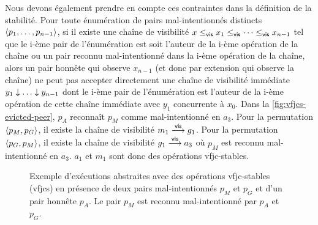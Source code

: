 Nous devons également prendre en compte ces contraintes dans la définition de la stabilité.
Pour toute énumération de pairs mal-intentionnés distincts $\tuple*{p_1, \dotsc ,p_{n-1}}$, si il existe une chaîne de visibilité $x \viseq x_1 \viseq \dotsb \viseq x_{n-1}$ tel que le i-ème pair de l'énumération est soit l'auteur de la i-ème opération de la chaîne ou un pair reconnu mal-intentionné dans la i-ème opération de la chaîne, alors un pair honnête qui observe $x_{n-1}$ (et donc par extension qui observe la chaîne) ne peut pas accepter directement une chaîne de visibilité immédiate $y_1 \idr \dotsc \idr y_{n-1}$ dont le i-ème pair de l'énumération est l'auteur de la i-ème opération de cette chaîne immédiate avec $y_1$ concurrente à $x_0$.
Dans la \autoref{fig:vfjcs-evicted-peer}, $p_A$ reconnaît $p_M$ comme mal-intentionné en $a_3$.
Pour la permutation $\tuple*{p_M, p_G}$, il existe la chaîne de visibilité $m_1 \vis g_1$.
Pour la permutation $\tuple*{p_G, p_M}$, il existe la chaîne de visibilité $g_1 \vis a_3$ où $p_M$ est reconnu mal-intentionné en $a_3$.
$a_1$ et $m_1$ sont donc des opérations vfjc-stables.

\begin{figure}[htb]
\centering
{}
\caption{Exemple d'exécutions abstraites avec des opérations vfjc-stables (vfjcs) en présence de deux pairs mal-intentionnés $p_M$ et $p_G$ et d'un pair honnête $p_A$.
Le pair $p_M$ est reconnu mal-intentionné par $p_A$ et $p_G$.}\label{fig:vfjcs-evicted-peer}
\end{figure}


